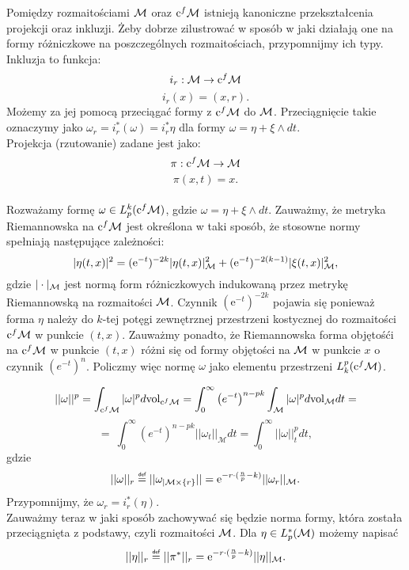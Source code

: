 \documentclass[licencjacka]{pracamgr}
\theoremstyle{definition}
\theoremstyle{definition}
\theoremstyle{plain}
\theoremstyle{plain}
\def\cfm{\ensuremath\mathrm{c}^f\mathcal{M}}
\def\M{\ensuremath\mathcal{M}}
\newcommand\deff{\mathrel{\overset{\makebox[0pt]{\mbox{\normalfont\tiny\sffamily def}}}{=}}}
\begin{document}
Pomiędzy rozmaitościami $\M$ oraz $\cfm$ istnieją kanoniczne przekształcenia
projekcji oraz inkluzji. Żeby dobrze zilustrować w sposób w jaki działają one
na formy różniczkowe na poszczególnych rozmaitościach, przypomnijmy ich typy.
Inkluzja to funkcja:
\[
    i_r: \M \rightarrow \cfm \\
\]
\[
    i_r(x) = (x, r).
\]
Możemy za jej pomocą przeciągać formy z $\cfm$ do $\M$. Przeciągnięcie takie
oznaczymy jako $\omega_r = i_r^\ast(\omega) = i_r^\ast \eta $ dla formy $\omega
= \eta + \xi \wedge dt$. \\
Projekcja (rzutowanie) zadane jest jako:
\[
    \pi: \cfm \rightarrow \M
\]
\[
    \pi (x, t) = x.
\] \\


Rozważamy formę $\omega \in L^k_p (\cfm)$, gdzie
$\omega = \eta + \xi \wedge dt$.
Zauważmy, że metryka Riemannowska na $\cfm$ jest określona w taki sposób, że
stosowne normy spełniają następujące zależności:
$$
| \eta(t,x) |^2 = (\mathrm{e}^{-t})^{-2k} | \eta(t,x) |^2_{\M} +
(\mathrm{e}^{-t})^{-2(k-1)} | \xi(t,x) |^2_{\M},
$$
gdzie $|\cdot |_{\M} $ jest normą form różniczkowych indukowaną przez
metrykę Riemannowską na rozmaitości $\M$.  Czynnik $(\mathrm{e}^{-t})^{-2k}$
pojawia się ponieważ forma $\eta$ należy do $k$-tej potęgi zewnętrznej
przestrzeni kostycznej do rozmaitości $\cfm$ w punkcie $(t,x)$.  Zauważmy
ponadto, że Riemannowska forma objętośći na $\cfm$ w punkcie $(t,x)$ różni się
od formy objętości na $\M$ w punkcie $x$ o czynnik $(e^{-t})^n$.  Policzmy więc
normę $\omega$ jako elementu przestrzeni $L_k^p (\cfm)$.

\[
    ||\omega ||^p = \int_{\cfm} |\omega |^p d \mathrm{vol}_{\cfm} =
    \int_0^\infty \left( e^{-t} \right)^{n-pk} \int_\mathcal{M} |\omega|^p d
    \mathrm{vol}_\mathcal{M} dt = 
\]
\[
    = \
    \int_0^\infty \left( e^{-t} \right)^{n-pk} || \omega_t ||_{\mathcal{M}} dt = 
    \int_0^\infty || \omega ||_t^p dt,
\] 
gdzie
\[
|| \omega ||_r \deff || \omega_{|\mathcal{M} \times \{r\} } || =
\mathrm{e}^{-r \cdot (\frac{n}{p} - k) }  ||\omega_r ||_{\M}.
\]
Przypomnijmy, że $\omega_r = i_r^\ast (\eta)$. \\

Zauważmy teraz w jaki sposób zachowywać się będzie norma formy, która
została przeciągnięta z podstawy, czyli rozmaitości $\M$. Dla 
$\eta \in L_p^\ast (\M)$ możemy napisać
\[
    || \eta ||_r \deff || \pi^\ast ||_r = 
\mathrm{e}^{-r \cdot (\frac{n}{p} - k) }  ||\eta ||_{\M}.
\] \\
\end{document}
